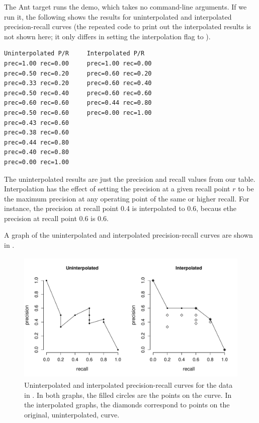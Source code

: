 The Ant target  runs the demo, which
takes no command-line arguments.  If we run it, the following shows
the results for uninterpolated and interpolated precision-recall
curves (the repeated code to print out the interpolated results
is not shown here; it only differs in setting the interpolation
flag to ).
%
\begin{verbatim}
Uninterpolated P/R     Interpolated P/R
prec=1.00 rec=0.00     prec=1.00 rec=0.00
prec=0.50 rec=0.20     prec=0.60 rec=0.20
prec=0.33 rec=0.20     prec=0.60 rec=0.40
prec=0.50 rec=0.40     prec=0.60 rec=0.60
prec=0.60 rec=0.60     prec=0.44 rec=0.80
prec=0.50 rec=0.60     prec=0.00 rec=1.00
prec=0.43 rec=0.60
prec=0.38 rec=0.60
prec=0.44 rec=0.80
prec=0.40 rec=0.80
prec=0.00 rec=1.00
\end{verbatim}
%
The uninterpolated results are just the precision and recall values
from our table.  Interpolation has the effect of setting the precision
at a given recall point $r$ to be the maximum precision at any
operating point of the same or higher recall.  For instance, the
precision at recall point 0.4 is interpolated to 0.6, becaus ethe
precision at recall point 0.6 is 0.6.

A graph of the uninterpolated and interpolated precision-recall
curves are shown in .
%
\begin{figure}
\begin{center}
\includegraphics[height=2.5in]{pdfs/pr-curves.pdf}
\vspace*{-24pt}
\end{center}
\caption{Uninterpolated and interpolated precision-recall curves
  for the data in .  In both graphs, the filled
  circles are the points on the curve.  In the interpolated graphs,
  the diamonds correspond to points on the original, uninterpolated,
  curve.}\label{fig:pr-curves}
\end{figure}


